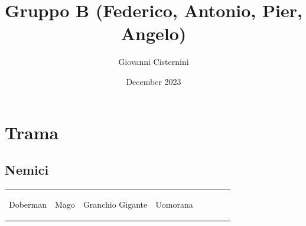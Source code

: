 \documentclass{article}
\title{Gruppo B (Federico, Antonio, Pier, Angelo)}
\author{Giovanni Cisternini}
\date{December 2023}
\begin{document}
\tableofcontents

\maketitle


\section{Trama}
\subsection{Nemici}
\begin{table}
    \centering
    \begin{tabular}{|cr|cr|cr|cr|}
        \hline
        \hypertarget{doberman}{Doberman} & Mago & \hypertarget{granchio}{Granchio Gigante} & \hypertarget{uomorana}{Uomorana}\\

\end{tabular}
\end{table}
\end{document}
